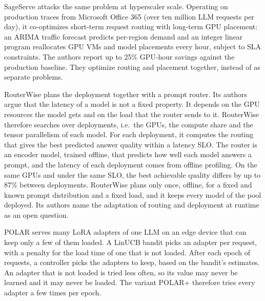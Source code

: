 SageServe \cite{sageserve} attacks the same problem at hyperscaler scale.
Operating on production traces from Microsoft Office 365 (over ten million LLM requests per day), it co-optimizes short-term request routing with long-term GPU placement:
an ARIMA traffic forecast predicts per-region demand and an integer linear program reallocates GPU VMs and model placements every hour, subject to SLA constraints.
The authors report up to 25\% GPU-hour savings against the production baseline.
They optimize routing and placement together, instead of as separate problems.

RouterWise \cite{routerwise} plans the deployment together with a prompt router.
Its authors argue that the latency of a model is not a fixed property.
It depends on the GPU resources the model gets and on the load that the router sends to it.
RouterWise therefore searches over deployments, i.e.\ the GPUs, the compute share and the tensor parallelism of each model.
For each deployment, it computes the routing that gives the best predicted answer quality within a latency SLO.
The router is an encoder model, trained offline, that predicts how well each model answers a prompt, and the latency of each deployment comes from offline profiling.
On the same GPUs and under the same SLO, the best achievable quality differs by up to 87\% between deployments.
RouterWise plans only once, offline, for a fixed and known prompt distribution and a fixed load, and it keeps every model of the pool deployed.
Its authors name the adaptation of routing and deployment at runtime as an open question.

POLAR \cite{polar} serves many LoRA adapters of one LLM on an edge device that can keep only a few of them loaded.
A LinUCB bandit picks an adapter per request, with a penalty for the load time of one that is not loaded.
After each epoch of requests, a controller picks the adapters to keep, based on the bandit's estimates.
An adapter that is not loaded is tried less often, so its value may never be learned and it may never be loaded.
The variant POLAR+ therefore tries every adapter a few times per epoch.

